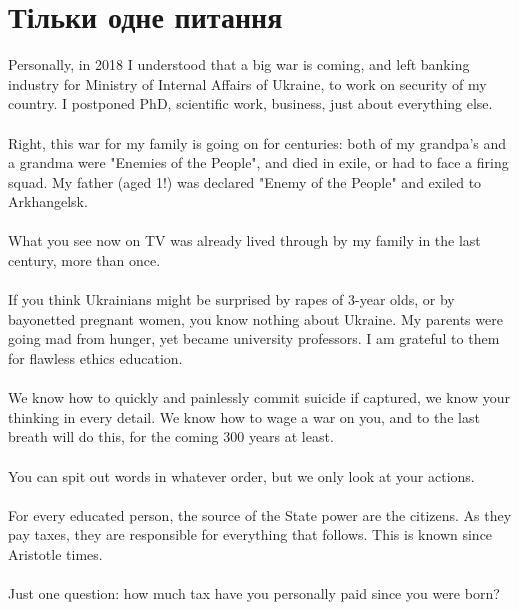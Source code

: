 \section{Тільки одне питання}

Personally, in 2018 I understood that a big war is coming, and left banking industry for Ministry of Internal Affairs of Ukraine, to work on security of my country. I postponed PhD, scientific work, business, just about everything else.
\\
\\
Right, this war for my family is going on for centuries: both of my grandpa's and a grandma were "Enemies of the People", and died in exile, or had to face a firing squad. My father (aged 1!) was declared "Enemy of the People" and exiled to Arkhangelsk.
\\
\\
What you see now on TV was already lived through by my family in the last century, more than once.
\\
\\
If you think Ukrainians might be surprised by rapes of 3-year olds, or by bayonetted pregnant women, you know nothing about Ukraine. My parents were going mad from hunger, yet became university professors. I am grateful to them for flawless ethics education.
\\
\\
We know how to quickly and painlessly commit suicide if captured, we know your thinking in every detail. We know how to wage a war on you, and to the last breath will do this, for the coming 300 years at least.
\\
\\
You can spit out words in whatever order, but we only look at your actions.
\\
\\
For every educated person, the source of the State power are the citizens. As they pay taxes, they are responsible for everything that follows. This is known since Aristotle times.
\\
\\
Just one question: how much tax have you personally paid since you were born?

\normalsize
